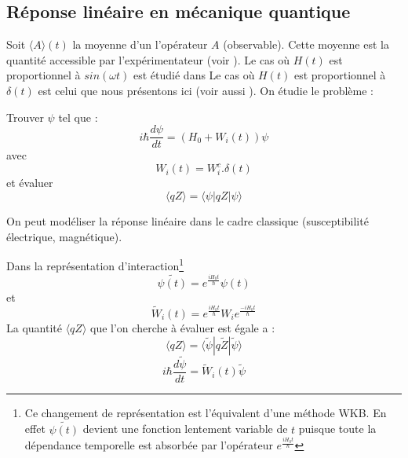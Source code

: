 \documentclass[12pt]{book}
\begin{document}
\subsection{R\'eponse lin\'eaire en m\'ecanique quantique}\label{secreplinmq}
Soit $ \langle A\rangle (t)$ la moyenne d'un l'op\'erateur $A$
(observable). Cette 
moyenne est la quantit\'e accessible par l'exp\'erimentateur (voir
\cite{ph:mecaq:Cohen73}).
Le cas o\`u $H(t)$ est proportionnel \`a $sin(\omega t)$ est \'etudi\'e dans \cite{ph:mecaq:Cohen73}
Le cas o\`u $H(t)$ est proportionnel \`a $\delta(t)$ est celui que
nous pr\'esentons ici (voir aussi \cite{ph:physt:Noziere}). 
On \'etudie le probl\`eme :
\begin{prob}
Trouver $\psi$ tel que :
\begin{equation}
i\hbar \frac{d\psi}{dt}=(H_0+W_i(t))\psi
\end{equation}
avec
\begin{equation}
W_i(t)=W_i^c.\delta(t)
\end{equation}
et \'evaluer 
\begin{equation}
 \langle qZ\rangle = \langle \psi|qZ|\psi\rangle 
\end{equation}
\end{prob}
\begin{rem}
On peut mod\'eliser la  r\'eponse lin\'eaire dans le cadre classique
(susceptibilit\'e \'electrique, magn\'etique).
\end{rem}
Dans la repr\'esentation d'interaction\footnote{%
Ce changement de repr\'esentation est l'\'equivalent d'une m\'ethode
WKB. En 
effet $\tilde{\psi(t)}$ devient une fonction lentement variable de $t$
puisque toute la d\'ependance temporelle est absorb\'ee par
l'op\'erateur $e^{\frac{iH_0t}{\hbar}}$}%
\begin{equation}
\tilde{\psi(t)}=e^{\frac{iH_0t}{\hbar}}\psi(t)
\end{equation}
et
\begin{equation}
\tilde{W}_i(t)=e^{\frac{iH_0t}{\hbar}}W_ie^{\frac{-iH_0t}{\hbar}}
\end{equation}
La quantit\'e $ \langle qZ\rangle $ que l'on cherche \`a \'evaluer est
\'egale a : 
\begin{equation}
 \langle qZ\rangle = \langle \tilde{\psi}|q\tilde{Z}|\tilde{\psi}\rangle 
\end{equation}
\begin{equation}
i\hbar \frac{d\tilde{\psi}}{dt}=\tilde{W}_i(t)\tilde{\psi}
\end{equation}
\end{document}
